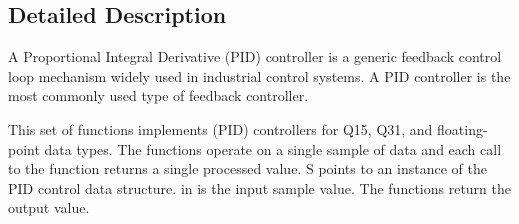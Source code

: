 \subsection{Detailed Description}
A Proportional Integral Derivative (P\-I\-D) controller is a generic feedback control loop mechanism widely used in industrial control systems. A P\-I\-D controller is the most commonly used type of feedback controller.

This set of functions implements (P\-I\-D) controllers for Q15, Q31, and floating-\/point data types. The functions operate on a single sample of data and each call to the function returns a single processed value. {\ttfamily S} points to an instance of the P\-I\-D control data structure. {\ttfamily in} is the input sample value. The functions return the output value.

